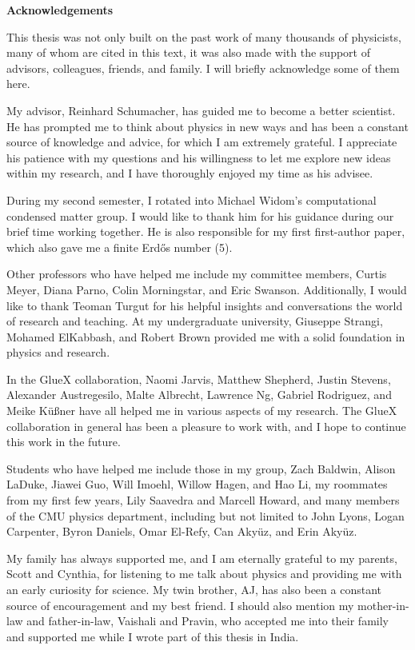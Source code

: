 \documentclass[final]{memoir}
\begin{document}
\clearpage
\thispagestyle{empty}
\begin{center}
  \large\bfseries Acknowledgements
\end{center}
\vspace{1cm}
This thesis was not only built on the past work of many thousands of physicists, many of whom are cited in this text, it was also made with the support of advisors, colleagues, friends, and family. I will briefly acknowledge some of them here.

My advisor, Reinhard Schumacher, has guided me to become a better scientist. He has prompted me to think about physics in new ways and has been a constant source of knowledge and advice, for which I am extremely grateful. I appreciate his patience with my questions and his willingness to let me explore new ideas within my research, and I have thoroughly enjoyed my time as his advisee.

During my second semester, I rotated into Michael Widom's computational condensed matter group. I would like to thank him for his guidance during our brief time working together. He is also responsible for my first first-author paper, which also gave me a finite Erd\H{o}s number (5).

Other professors who have helped me include my committee members, Curtis Meyer, Diana Parno, Colin Morningstar, and Eric Swanson. Additionally, I would like to thank Teoman Turgut for his helpful insights and conversations the world of research and teaching. At my undergraduate university, Giuseppe Strangi, Mohamed ElKabbash, and Robert Brown provided me with a solid foundation in physics and research.

In the GlueX collaboration, Naomi Jarvis, Matthew Shepherd, Justin Stevens, Alexander Austregesilo, Malte Albrecht, Lawrence Ng, Gabriel Rodriguez, and Meike K{\"u}{\ss}ner have all helped me in various aspects of my research. The GlueX collaboration in general has been a pleasure to work with, and I hope to continue this work in the future.

Students who have helped me include those in my group, Zach Baldwin, Alison LaDuke, Jiawei Guo, Will Imoehl, Willow Hagen, and Hao Li, my roommates from my first few years, Lily Saavedra and Marcell Howard, and many members of the CMU physics department, including but not limited to John Lyons, Logan Carpenter, Byron Daniels, Omar El-Refy, Can Aky\"uz, and Erin Aky\"uz.

My family has always supported me, and I am eternally grateful to my parents, Scott and Cynthia, for listening to me talk about physics and providing me with an early curiosity for science. My twin brother, AJ, has also been a constant source of encouragement and my best friend. I should also mention my mother-in-law and father-in-law, Vaishali and Pravin, who accepted me into their family and supported me while I wrote part of this thesis in India.
\end{document}
